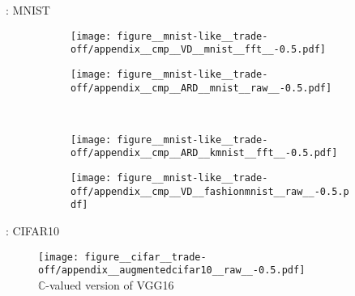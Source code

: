 \documentclass[handout]{beamer}
\newcommand{\cplx}{\mathbb{C}}
\begin{document}
\begin{frame}{\insertsection: MNIST}
  \begin{figure}[t]
    \begin{subfigure}[b]{0.5\columnwidth}
      \centering
      \texttt{[image: figure\_\_mnist-like\_\_trade-off/appendix\_\_cmp\_\_VD\_\_mnist\_\_fft\_\_-0.5.pdf]}
    \end{subfigure}\hspace{-1em}%
    \begin{subfigure}[b]{0.5\columnwidth}
      \centering
      \texttt{[image: figure\_\_mnist-like\_\_trade-off/appendix\_\_cmp\_\_ARD\_\_mnist\_\_raw\_\_-0.5.pdf]}
    \end{subfigure} \\ %
    \begin{subfigure}[b]{0.5\columnwidth}
      \centering
      \texttt{[image: figure\_\_mnist-like\_\_trade-off/appendix\_\_cmp\_\_ARD\_\_kmnist\_\_fft\_\_-0.5.pdf]}
    \end{subfigure}\hspace{-1em}%
    \begin{subfigure}[b]{0.5\columnwidth}
      \centering
      \texttt{[image: figure\_\_mnist-like\_\_trade-off/appendix\_\_cmp\_\_VD\_\_fashionmnist\_\_raw\_\_-0.5.pdf]}
    \end{subfigure}%
  \end{figure}

\end{frame}

\begin{frame}[c]{\insertsection: CIFAR10}
  \begin{figure}[t]
    \centering
    \texttt{[image: figure\_\_cifar\_\_trade-off/appendix\_\_augmentedcifar10\_\_raw\_\_-0.5.pdf]}
    \\
    {$\cplx$-valued version of VGG16 \citep{simonyan_very_2015}}
  \end{figure}

\end{frame}
\end{document}
